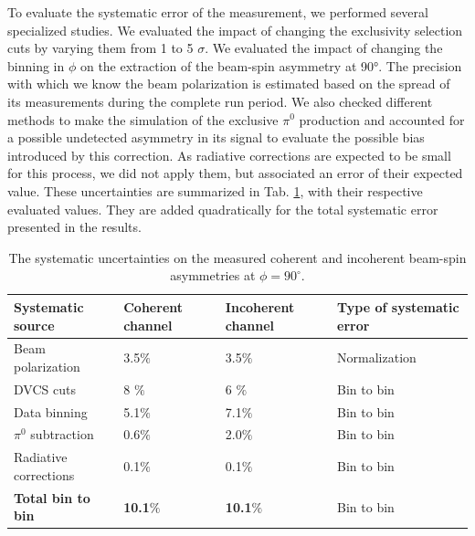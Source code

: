 \documentclass{article}
\begin{document}
To evaluate the systematic error of the measurement, we performed several specialized studies. We 
evaluated the impact of changing the exclusivity selection cuts by varying them from 1 to 5 $\sigma$. 
We evaluated the impact of changing the binning in $\phi$ on the extraction of the beam-spin asymmetry
at 90°. The precision with which we know the beam polarization is estimated based on the spread 
of its measurements during the complete run period. We also checked different methods to make the 
simulation of the exclusive $\pi^0$ production and accounted for a possible undetected 
asymmetry in its signal to evaluate the 
possible bias introduced by this correction. As radiative corrections are expected to be small
for this process, we did not apply them, but associated an error of their expected value.
These uncertainties are summarized in Tab. \ref{Table:systematic_uncertainties}, with their respective 
evaluated values. They are added quadratically for the total systematic error presented in the results.

\begin{table}[tbp]
\begin{center}
	\begin{tabular}{|m{4cm}|m{2cm}<{\centering}|m{2.3cm}<{\centering}|m{3.7cm}<{\centering}|}
\hline
\bf Systematic source & \bf  Coherent channel  & \bf Incoherent channel & \bf Type of systematic 
error\\
\hline
Beam polarization &  3.5$\%$ &  3.5$\%$& Normalization\\
\hline
\hline
DVCS cuts & 8 $\%$ &  6 $\%$ & Bin to bin\\
\hline
Data binning & 5.1$\%$ & 7.1$\%$ & Bin to bin\\
\hline
$\pi^0$ subtraction &  0.6$\%$ &  2.0$\%$ & Bin to bin\\
\hline
Radiative corrections &  0.1$\%$ & 0.1$\%$ & Bin to bin\\
\hline
\hline
\textbf{Total bin to bin} &  \textbf{10.1}$\%$ &   \textbf{10.1}$\%$ & Bin to 
bin\\
\hline
\end{tabular}
\caption{The systematic uncertainties on the measured coherent and incoherent 
beam-spin asymmetries at $\phi = 90^{\circ}$.}
\label{Table:systematic_uncertainties}
\end{center}
\end{table}
\end{document}
